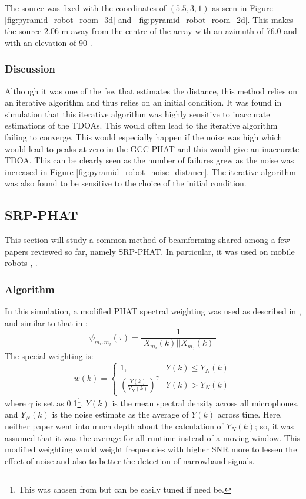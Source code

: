\documentclass[notitlepage]{report}
\begin{document}
The source was fixed with the coordinates of $(5.5,3,1)$ as seen in Figure-\ref{fig:pyramid_robot_room_3d} and -\ref{fig:pyramid_robot_room_2d}. This makes the source 2.06 \si{m} away from the centre of the array with an azimuth of 76.0 \si{\deg} and with an elevation of 90 \si{\deg}.

\subsubsection{Discussion}

Although it was one of the few that estimates the distance, this method relies on an iterative algorithm and thus relies on an initial condition. It was found in simulation that this iterative algorithm was highly sensitive to inaccurate estimations of the TDOAs. This would often lead to the iterative algorithm failing to converge. This would especially happen if the noise was high which would lead to peaks at zero in the GCC-PHAT and this would give an inaccurate TDOA. This can be clearly seen as the number of failures grew as the noise was increased in Figure-\ref{fig:pyramid_robot_noise_distance}. The iterative algorithm was also found to be sensitive to the choice of the initial condition.

\subsection{SRP-PHAT}

This section will study a common method of beamforming shared among a few papers reviewed so far, namely SRP-PHAT. In particular, it was used on mobile robots \cite{valin_localization_2004}, \cite{valin_robust_2007}.

\subsubsection{Algorithm}

In this simulation, a modified PHAT spectral weighting was used as described in \cite{valin_localization_2004}, and similar to that in \cite{valin_robust_2003}:
\begin{equation}
\psi_{m_i,m_j}(\tau) = \frac{1}{\lvert X_{m_i}(k) \rvert \lvert X_{m_j}(k) \rvert}
\end{equation}
The special weighting is:
\begin{equation}
w(k) =
\begin{cases}
	1,										& Y(k) \leq Y_N(k) \\
	\left( \frac{Y(k)}{Y_N(k)}\right)^\gamma	& Y(k) > Y_N(k)
\end{cases}
\end{equation}
where $\gamma$ is set as 0.1\footnote{This was chosen from \cite{valin_localization_2004} but can be easily tuned if need be.}, $Y(k)$ is the mean spectral density across all microphones, and $Y_N(k)$ is the noise estimate as the average of $Y(k)$ across time. Here, neither paper went into much depth about the calculation of $Y_N(k)$; so, it was assumed that it was the average for all runtime instead of a moving window. This modified weighting would weight frequencies with higher SNR more to lessen the effect of noise and also to better the detection of narrowband signals.
\end{document}
